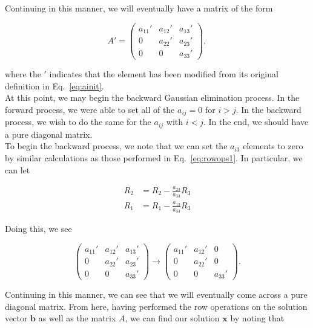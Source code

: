 \documentclass[12pt]{article}
\numberwithin{equation}{section}
\begin{document}
\noindent Continuing in this manner, we will eventually have a matrix of the form 

\begin{equation}
A\prime = \left(
\begin{array}{ccc}
a_{11}\prime & a_{12}\prime & a_{13}\prime \\
0 & a_{22}\prime & a_{23}\prime \\
0 & 0 & a_{33}\prime
\end{array}\right),
\end{equation}

\noindent where the $\prime$ indicates that the element has been modified from its original definition in Eq.~\ref{eq:ainit}.  
\\\indent At this point, we may begin the backward Gaussian elimination process.  In the forward process, we were able to set all of the $a_{ij}=0$ for $i>j$.  In the backward process, we wish to do the same for the $a_{ij}$ with $i<j$.  In the end, we should have a pure diagonal matrix.
\\\indent To begin the backward process, we note that we can set the $a_{i3}$ elements to zero by similar calculations as those performed in Eq.~\ref{eq:rowops1}.  In particular, we can let 

\begin{equation}
\label{eq:rowops2}
\begin{align}
R_{2} &= R_{2} - \frac{a_{23}}{a_{33}}R_{3} \\
R_{1} &= R_{1} - \frac{a_{13}}{a_{33}}R_{3}
\end{align}
\end{equation}

\noindent Doing this, we see 

$$\left(
\begin{array}{ccc}
a_{11}\prime & a_{12}\prime & a_{13}\prime \\
0 & a_{22}\prime & a_{23}\prime \\
0 & 0 & a_{33}\prime
\end{array}\right) \rightarrow
\left(\begin{array}{ccc}
a_{11}\prime & a_{12}\prime & 0 \\
0 & a_{22}\prime & 0 \\
0 & 0 & a_{33}\prime 
\end{array}\right).$$

\noindent Continuing in this manner, we can see that we will eventually come across a pure diagonal matrix.  From here, having performed the row operations on the solution vector $\textbf{b}$ as well as the matrix $A$, we can find our solution $\textbf{x}$ by noting that 
\end{document}
